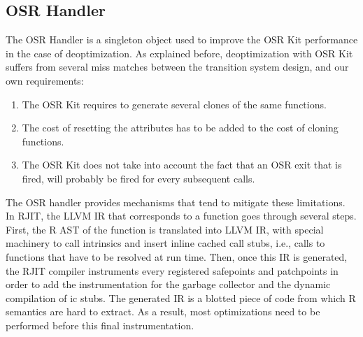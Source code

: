 \subsection{OSR Handler}
The OSR Handler is a singleton object used to improve the OSR Kit performance in the case of deoptimization. 
As explained before, deoptimization with OSR Kit suffers from several miss matches between the transition system design, and our own requirements: 
\begin{enumerate}
    \item The OSR Kit requires to generate several clones of the same functions.
    \item The cost of resetting the attributes has to be added to the cost of cloning functions.
    \item The OSR Kit does not take into account the fact that an OSR exit that is fired, will probably be fired for every subsequent calls.
\end{enumerate}
The OSR handler provides mechanisms that tend to mitigate these limitations.\\

In RJIT, the LLVM IR that corresponds to a function goes through several steps.
First, the R AST of the function is translated into LLVM IR, with special machinery to call intrinsics and insert inline cached call stubs, i.e., calls to functions that have to be resolved at run time.
Then, once this IR is generated, the RJIT compiler instruments every registered safepoints and patchpoints in order to add the instrumentation for the garbage collector and the dynamic compilation of ic stubs.
The generated IR is a blotted piece of code from which R semantics are hard to extract.
As a result, most optimizations need to be performed before this final instrumentation.\\

